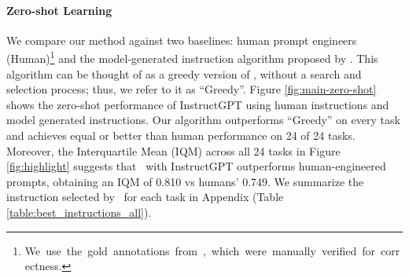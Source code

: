 \paragraph{Zero-shot Learning}
We compare our method against two baselines: human prompt engineers (Human)\footnote{\mbox{We use the gold annotations from \citet{honovich2022instruction}, which were manually verified for correctness.}} and the model-generated instruction algorithm proposed by \citet{honovich2022instruction}. This algorithm can be thought of as a greedy version of \algname, without a search and selection process; thus, we refer to it as ``Greedy''. Figure \ref{fig:main-zero-shot} shows the zero-shot performance of InstructGPT using human instructions and model generated instructions. Our algorithm outperforms ``Greedy'' on every task and achieves equal or better than human performance on 24 of 24 tasks. Moreover, the Interquartile Mean (IQM) \citep{agarwal2021deep} across all 24 tasks in Figure \ref{fig:highlight} suggests that \algname~with InstructGPT outperforms human-engineered prompts, obtaining an IQM of 0.810 vs humans' 0.749. We summarize the instruction selected by \algname~for each task in Appendix (Table \ref{table:best_instructions_all}).



